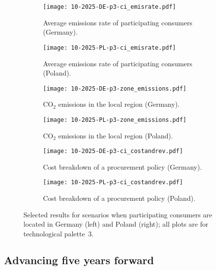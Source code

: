 \documentclass[11pt, 5p, nopreprintline]{elsarticle}
\begin{document}
\begin{figure*}
    \centering
    \begin{subfigure}{0.5\textwidth}
        \centering
        \caption{Average emissions rate of participating consumers (Germany).}
        \texttt{[image: 10-2025-DE-p3-ci\_emisrate.pdf]}
        \label{fig:10-2025-DE-p3-ci_emisrate}
    \end{subfigure}%
    \begin{subfigure}{0.5\textwidth}
        \centering
        \caption{Average emissions rate of participating consumers (Poland).}
        \texttt{[image: 10-2025-PL-p3-ci\_emisrate.pdf]}
        \label{fig:10-2025-PL-p3-ci_emisrate}
    \end{subfigure}

    \begin{subfigure}{0.5\textwidth}
        \centering
        \caption{CO$_2$ emissions in the local region (Germany).}
        \texttt{[image: 10-2025-DE-p3-zone\_emissions.pdf]}
        \label{fig:10-2025-DE-p3-zone_emissions}
    \end{subfigure}%
    \begin{subfigure}{0.5\textwidth}
        \centering
        \caption{CO$_2$ emissions in the local region (Poland).}
        \texttt{[image: 10-2025-PL-p3-zone\_emissions.pdf]}
        \label{fig:10-2025-PL-p3-zone_emissions}
    \end{subfigure}%

    \begin{subfigure}{0.5\textwidth}
        \centering
        \caption{Cost breakdown of a procurement policy (Germany).}
        \texttt{[image: 10-2025-DE-p3-ci\_costandrev.pdf]}
        \label{fig:10-2025-DE-p3-ci_costandrev}
    \end{subfigure}%
    \begin{subfigure}{0.5\textwidth}
        \centering
        \caption{Cost breakdown of a procurement policy (Poland).}
        \texttt{[image: 10-2025-PL-p3-ci\_costandrev.pdf]}
        \label{fig:10-2025-PL-p3-ci_costandrev}
    \end{subfigure}
    \caption{Selected results for scenarios when participating consumers are located in Germany (left) and Poland (right); all plots are for technological palette~3.}
    \label{fig:10-2025-DEPL-p3-4plots}
\end{figure*}


\subsection{Advancing five years forward}
\label{subsec:time}
\end{document}
